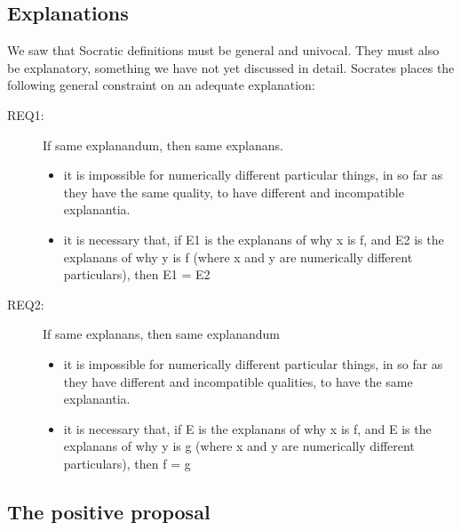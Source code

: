 \documentclass[oneside]{article}
\begin{document}
\subsection*{Explanations}
We saw that Socratic definitions must be general and univocal. They must also be explanatory, something we have not yet discussed in detail. Socrates places the following general constraint on an adequate explanation: 

\begin{description}
\item[REQ1:] If same explanandum, then same explanans.
\begin{itemize}
\item it is impossible for numerically different particular things, in so far as they have the same quality, to have different and incompatible explanantia.
\item it is necessary that, if E1 is the explanans of why x is f, and E2 is the explanans of why y is f (where x and y are numerically different particulars), then E1 = E2
\end{itemize}
\item[REQ2:] If same explanans, then same explanandum
\begin{itemize}
\item	it is impossible for numerically different particular things, in so far as they have different and incompatible qualities, to have the same explanantia.
\item	it is necessary that, if E is the explanans of why x is f, and E is the explanans of why y is g (where x and y are numerically different particulars), then f = g
\end{itemize}
\end{description}




\subsection*{The positive proposal}
\end{document}
